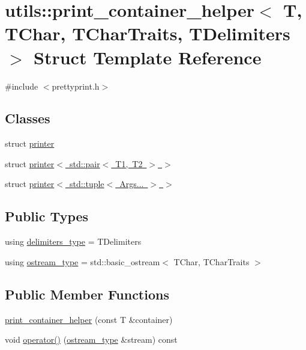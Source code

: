 \hypertarget{structutils_1_1print__container__helper}{}\section{utils\+::print\+\_\+container\+\_\+helper$<$ T, T\+Char, T\+Char\+Traits, T\+Delimiters $>$ Struct Template Reference}
\label{structutils_1_1print__container__helper}


{\ttfamily \#include $<$prettyprint.\+h$>$}

\subsection*{Classes}
\begin{DoxyCompactItemize}
\item 
struct \mbox{\hyperlink{structutils_1_1print__container__helper_1_1printer}{printer}}
\item 
struct \mbox{\hyperlink{structutils_1_1print__container__helper_1_1printer_3_01std_1_1pair_3_01_t1_00_01_t2_01_4_01_4}{printer$<$ std\+::pair$<$ T1, T2 $>$ $>$}}
\item 
struct \mbox{\hyperlink{structutils_1_1print__container__helper_1_1printer_3_01std_1_1tuple_3_01_args_8_8_8_01_4_01_4}{printer$<$ std\+::tuple$<$ Args... $>$ $>$}}
\end{DoxyCompactItemize}
\subsection*{Public Types}
\begin{DoxyCompactItemize}
\item 
using \mbox{\hyperlink{structutils_1_1print__container__helper_a091ced23409c5a8994e917861af4c1e3}{delimiters\+\_\+type}} = T\+Delimiters
\item 
using \mbox{\hyperlink{structutils_1_1print__container__helper_a49abcd9f1eb893c1389687f0c7de5811}{ostream\+\_\+type}} = std\+::basic\+\_\+ostream$<$ T\+Char, T\+Char\+Traits $>$
\end{DoxyCompactItemize}
\subsection*{Public Member Functions}
\begin{DoxyCompactItemize}
\item 
\mbox{\hyperlink{structutils_1_1print__container__helper_abf41263931ab78630009002fb91334e8}{print\+\_\+container\+\_\+helper}} (const T \&container)
\item 
void \mbox{\hyperlink{structutils_1_1print__container__helper_a0d150a3818dbd4aeafd23cc798e9028a}{operator()}} (\mbox{\hyperlink{structutils_1_1print__container__helper_a49abcd9f1eb893c1389687f0c7de5811}{ostream\+\_\+type}} \&stream) const
\end{DoxyCompactItemize}


